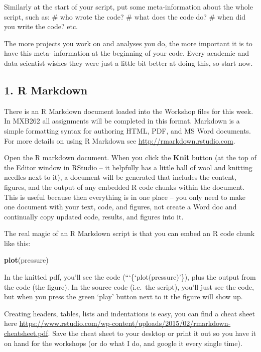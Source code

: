 \documentclass[]{article}
\newenvironment{Shaded}{\begin{snugshade}}{\end{snugshade}}
\newcommand{\KeywordTok}[1]{\textcolor[rgb]{0.13,0.29,0.53}{\textbf{#1}}}
\newcommand{\NormalTok}[1]{#1}
\begin{document}
Similarly at the start of your script, put some meta-information about
the whole script, such as: \# who wrote the code? \# what does the code
do? \# when did you write the code? etc.

The more projects you work on and analyses you do, the more important it
is to have this meta- information at the beginning of your code. Every
academic and data scientist wishes they were just a little bit better at
doing this, so start now.

\hypertarget{r-markdown}{%
\subsection{1. R Markdown}\label{r-markdown}}

There is an R Markdown document loaded into the Workshop files for this
week. In MXB262 all assignments will be completed in this format.
Markdown is a simple formatting syntax for authoring HTML, PDF, and MS
Word documents. For more details on using R Markdown see
\url{http://rmarkdown.rstudio.com}.

Open the R markdown document. When you click the \textbf{Knit} button
(at the top of the Editor window in RStudio -- it helpfully has a little
ball of wool and knitting needles next to it), a document will be
generated that includes the content, figures, and the output of any
embedded R code chunks within the document. This is useful because then
everything is in one place -- you only need to make one document with
your text, code, and figures, not create a Word doc and continually copy
updated code, results, and figures into it.

The real magic of an R Markdown script is that you can embed an R code
chunk like this:

\begin{Shaded}
\begin{Highlighting}[]
\KeywordTok{plot}\NormalTok{(pressure)}
\end{Highlighting}
\end{Shaded}

In the knitted pdf, you'll see the code (```\{`plot(pressure)'\}), plus
the output from the code (the figure). In the source code (i.e.~the
script), you'll just see the code, but when you press the green `play'
button next to it the figure will show up.

Creating headers, tables, lists and indentations is easy, you can find a
cheat sheet here
\url{https://www.rstudio.com/wp-content/uploads/2015/02/rmarkdown-cheatsheet.pdf}.
Save the cheat sheet to your desktop or print it out so you have it on
hand for the workshops (or do what I do, and google it every single
time).
\end{document}
